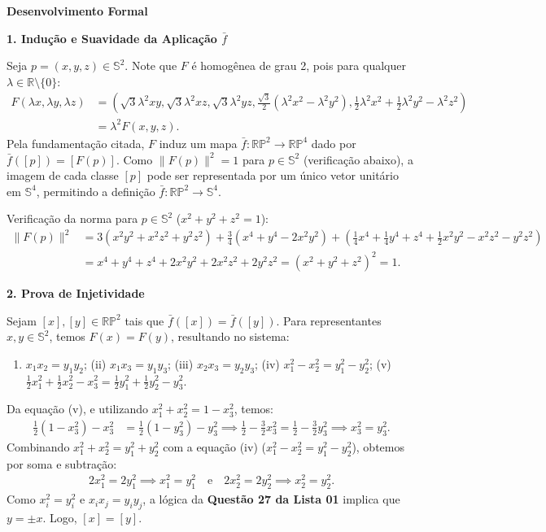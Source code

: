 {	\textbf{Desenvolvimento Formal}
	
	\textbf{1. Indução e Suavidade da Aplicação $\bar{f}$}
	
	Seja $p = (x, y, z) \in \mathbb{S}^2$. Note que $F$ é homogênea de grau 2, pois para qualquer $\lambda \in \mathbb{R}\setminus\{0\}$:
	\begin{align*}
		F(\lambda x, \lambda y, \lambda z) &= \left(\sqrt{3}\lambda^2 xy, \sqrt{3}\lambda^2 xz, \sqrt{3}\lambda^2 yz, \frac{\sqrt{3}}{2}(\lambda^2 x^2 - \lambda^2 y^2), \frac{1}{2}\lambda^2 x^2 + \frac{1}{2}\lambda^2 y^2 - \lambda^2 z^2\right) \\
		&= \lambda^2 F(x, y, z).
	\end{align*}
	Pela fundamentação citada, $F$ induz um mapa $\bar{f}: \mathbb{RP}^2 \to \mathbb{RP}^4$ dado por $\bar{f}([p]) = [F(p)]$. Como $\|F(p)\|^2 = 1$ para $p \in \mathbb{S}^2$ (verificação abaixo), a imagem de cada classe $[p]$ pode ser representada por um único vetor unitário em $\mathbb{S}^4$, permitindo a definição $\bar{f}: \mathbb{RP}^2 \to \mathbb{S}^4$.
	
	Verificação da norma para $p \in \mathbb{S}^2$ ($x^2+y^2+z^2=1$):
	\begin{align*}
		\|F(p)\|^2 &= 3(x^2y^2 + x^2z^2 + y^2z^2) + \frac{3}{4}(x^4 + y^4 - 2x^2y^2) + \left(\frac{1}{4}x^4 + \frac{1}{4}y^4 + z^4 + \frac{1}{2}x^2y^2 - x^2z^2 - y^2z^2\right) \\
		&= x^4 + y^4 + z^4 + 2x^2y^2 + 2x^2z^2 + 2y^2z^2 = (x^2 + y^2 + z^2)^2 = 1.
	\end{align*}
	
	\textbf{2. Prova de Injetividade}
	
	Sejam $[x], [y] \in \mathbb{RP}^2$ tais que $\bar{f}([x]) = \bar{f}([y])$. Para representantes $x, y \in \mathbb{S}^2$, temos $F(x) = F(y)$, resultando no sistema:
	\begin{enumerate}[label=(\roman*)]
		\item $x_1x_2 = y_1y_2$; (ii) $x_1x_3 = y_1y_3$; (iii) $x_2x_3 = y_2y_3$; (iv) $x_1^2 - x_2^2 = y_1^2 - y_2^2$; (v) $\frac{1}{2}x_1^2 + \frac{1}{2}x_2^2 - x_3^2 = \frac{1}{2}y_1^2 + \frac{1}{2}y_2^2 - y_3^2$.
	\end{enumerate}
	Da equação (v), e utilizando $x_1^2+x_2^2 = 1-x_3^2$, temos:
	\begin{align*}
		\frac{1}{2}(1-x_3^2) - x_3^2 &= \frac{1}{2}(1-y_3^2) - y_3^2 \implies \frac{1}{2} - \frac{3}{2}x_3^2 = \frac{1}{2} - \frac{3}{2}y_3^2 \implies x_3^2 = y_3^2.
	\end{align*}
	Combinando $x_1^2+x_2^2 = y_1^2+y_2^2$ com a equação (iv) ($x_1^2-x_2^2 = y_1^2-y_2^2$), obtemos por soma e subtração:
	\begin{align*}
		2x_1^2 = 2y_1^2 \implies x_1^2 = y_1^2 \quad \text{e} \quad 2x_2^2 = 2y_2^2 \implies x_2^2 = y_2^2.
	\end{align*}
	Como $x_i^2 = y_i^2$ e $x_ix_j = y_iy_j$, a lógica da \textbf{Questão 27 da Lista 01} implica que $y = \pm x$. Logo, $[x] = [y]$.
	
}
